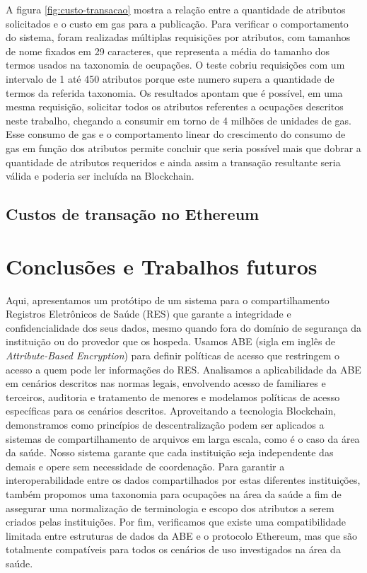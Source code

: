 \documentclass[a4paper,11pt]{article}
\begin{document}
A figura \ref{fig:custo-transacao} mostra a relação entre a quantidade de atributos solicitados e o custo em gas para a publicação.
Para verificar o comportamento do sistema, foram realizadas múltiplas requisições por atributos, com tamanhos de nome fixados em 29 caracteres, que representa a média do tamanho dos termos usados na taxonomia de ocupações.
O teste cobriu requisições com um intervalo de 1 até 450 atributos porque este numero supera a quantidade de termos da referida taxonomia.
Os resultados apontam que é possível, em uma mesma requisição, solicitar todos os atributos referentes a ocupações descritos neste trabalho, chegando a consumir em torno de 4 milhões de unidades de gas.
Esse consumo de gas e o comportamento linear do crescimento do consumo de gas em função dos atributos permite concluir que seria possível mais que dobrar a quantidade de atributos requeridos e ainda assim a transação resultante seria válida e poderia ser incluída na Blockchain.


\subsection{Custos de transação no Ethereum}
\label{sec:sub:experimento-custos}



\newpage
\section{Conclusões e Trabalhos futuros}

Aqui, apresentamos um protótipo de um sistema para o compartilhamento Registros Eletrônicos de Saúde (RES) que garante a integridade e confidencialidade dos seus dados, mesmo quando fora do domínio de segurança da instituição ou do provedor que os hospeda.
Usamos ABE (sigla em inglês de \emph{Attribute-Based Encryption}) para definir políticas de acesso que restringem o acesso a quem pode ler informações do RES.
Analisamos a aplicabilidade da ABE em cenários descritos nas normas legais, envolvendo acesso de familiares e terceiros, auditoria e tratamento de menores e modelamos políticas de acesso específicas para os cenários descritos.
Aproveitando a tecnologia Blockchain, demonstramos como princípios de descentralização podem ser aplicados a sistemas de compartilhamento de arquivos em larga escala, como é o caso da área da saúde.
Nosso sistema garante que cada instituição seja independente das demais e opere sem necessidade de coordenação.
Para garantir a interoperabilidade entre os dados compartilhados por estas diferentes instituições, também propomos uma taxonomia para ocupações na área da saúde a fim de assegurar uma normalização de terminologia e escopo dos atributos a serem criados pelas instituições.
Por fim, verificamos que existe uma compatibilidade limitada entre estruturas de dados da ABE e o protocolo Ethereum, mas que são totalmente compatíveis para todos os cenários de uso investigados na área da saúde.
\end{document}
